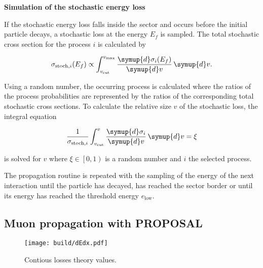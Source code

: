 \textbf{Simulation of the stochastic energy loss}

If the stochastic energy loss falls inside the sector and occurs before the initial particle decays, a stochastic loss at the energy $E_f$ is sampled.
The total stochastic cross section for the process $i$ is calculated by

\begin{equation}
	\sigma_{\text{stoch},i}(E_f) \propto \int_{v_\text{cut}}^{v_\text{max}} \frac{\symup{d}\sigma_i(E_f)}{\symup{d}v} \, \symup{d}v.
\end{equation}

Using a random number, the occurring process is calculated where the ratios of the process probabilities are represented by the ratios of the corresponding total stochastic cross sections.
To calculate the relative size $v$ of the stochastic loss, the integral equation

\begin{equation}
	\frac{1}{\sigma_{\text{stoch},i}} \int_{v_\text{cut}}^{v} \frac{\symup{d}\sigma_i}{\symup{d}v} \, \symup{d}v = \xi
\end{equation}

is solved for $v$ where $\xi \in \left[0,1\right)$ is a random number and $i$ the selected process.

The propagation routine is repeated with the sampling of the energy of the next interaction until the particle has decayed, has reached the sector border or until its energy has reached the threshold energy $e_\text{low}$.

\subsection{Muon propagation with PROPOSAL}



\begin{figure}
    \centering
    \texttt{[image: build/dEdx.pdf]}
    \caption{Contious losses theory values.}
    \label{fig:dEdx}
\end{figure}


